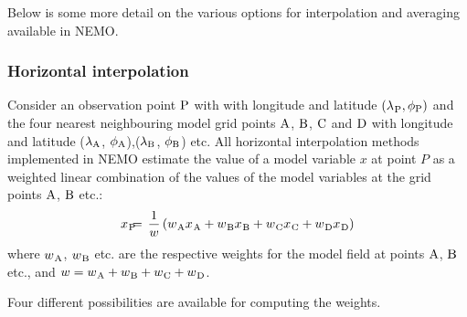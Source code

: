 \documentclass[../main/NEMO_manual]{subfiles}
\begin{document}
Below is some more detail on the various options for interpolation and averaging available in NEMO.

\subsubsection{Horizontal interpolation}

Consider an observation point ${\rm P}$ with with longitude and latitude $({\lambda_{}}_{\rm P}, \phi_{\rm P})$ and
the four nearest neighbouring model grid points ${\rm A}$, ${\rm B}$, ${\rm C}$ and ${\rm D}$ with
longitude and latitude ($\lambda_{\rm A}$, $\phi_{\rm A}$),($\lambda_{\rm B}$, $\phi_{\rm B}$) etc.
All horizontal interpolation methods implemented in NEMO estimate the value of a model variable $x$ at point $P$ as
a weighted linear combination of the values of the model variables at the grid points ${\rm A}$, ${\rm B}$ etc.:
\begin{align*}
  {x_{}}_{\rm P} & \hspace{-2mm} = \hspace{-2mm} &
                                                   \frac{1}{w} \left( {w_{}}_{\rm A} {x_{}}_{\rm A} +
                                                   {w_{}}_{\rm B} {x_{}}_{\rm B} +
                                                   {w_{}}_{\rm C} {x_{}}_{\rm C} +
                                                   {w_{}}_{\rm D} {x_{}}_{\rm D} \right)
\end{align*}
where ${w_{}}_{\rm A}$, ${w_{}}_{\rm B}$ etc. are the respective weights for the model field at
points ${\rm A}$, ${\rm B}$ etc., and $w = {w_{}}_{\rm A} + {w_{}}_{\rm B} + {w_{}}_{\rm C} + {w_{}}_{\rm D}$.

Four different possibilities are available for computing the weights.
\end{document}
